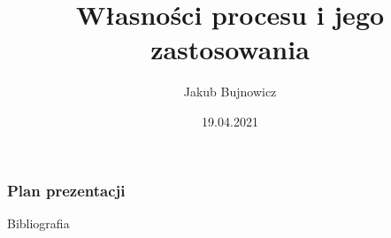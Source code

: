 \documentclass[12pt,fleqn]{beamer}
\title[]{\bfseries Własności procesu \procesVG i jego zastosowania}
\author{Jakub Bujnowicz}
\date{19.04.2021}
\institute{Instytut Matematyki PŁ}
\begin{document}
\thispagestyle{empty}
\titlepage

\begin{frame}
    \frametitle{Plan prezentacji}
    \vspace{-1cm}
    \tableofcontents
\end{frame}





\begin{frame}{Bibliografia}
    \nocite{mikosch2009nonlife}
    \nocite{protter2005sde}
    \nocite{ken1999levy}
    \nocite{brockwell2001carmalevy}
    \printbibliography
\end{frame}
\end{document}
